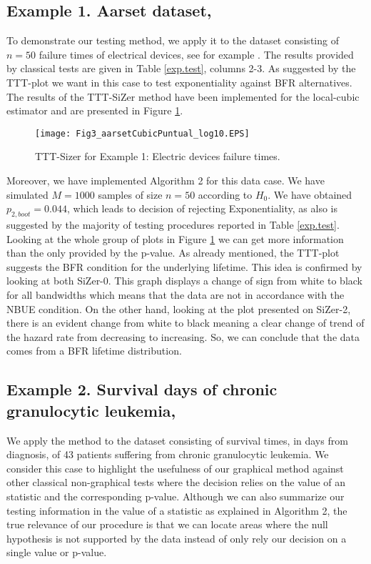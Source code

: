 \documentclass[preprint,12pt]{elsarticle}
\begin{document}
\subsection*{Example 1. Aarset dataset, \cite{A1987}}
To demonstrate our testing method, we apply it to the dataset consisting of $n=50$ failure times of electrical devices, see for example \cite{A1987}. The results provided by classical tests are given in Table \ref{exp.test}, columns 2-3.
As suggested by the TTT-plot we want in this case to test exponentiality against BFR alternatives. The results of the TTT-SiZer method have been implemented for the local-cubic estimator and are presented in Figure \ref{Fig:aarset}. 
\begin{figure}[h]
\begin{center}
\texttt{[image: Fig3\_aarsetCubicPuntual\_log10.EPS]}
\caption{TTT-Sizer for Example 1: Electric devices failure times.}\label{Fig:aarset}
\end{center}
\end{figure}

Moreover, we have implemented Algorithm 2 for this data case. We have simulated $M=1000$ samples of size $n=50$ according to $H_0$. We have obtained $p_{2,boot}=0.044$, which leads to decision of rejecting Exponentiality, as also is suggested by the majority of testing procedures reported in Table \ref{exp.test}. Looking at the whole group of plots in Figure \ref{Fig:aarset} we can get more information than the only provided by the p-value. As already mentioned, the TTT-plot suggests the BFR condition for the underlying lifetime. This idea is confirmed by looking at both SiZer-0. This graph displays a change of sign from white to black for all bandwidths which means that the data are not in accordance with the NBUE condition. On the other hand, looking at the plot presented on SiZer-2, there is an evident change from white to black meaning a clear change of trend of the hazard rate from decreasing to increasing. So, we can conclude that the data comes from a BFR lifetime distribution. 

\subsection*{Example 2. Survival days of chronic granulocytic leukemia, \cite{BS69}}
We apply the method to the dataset consisting of survival times, in days from diagnosis, of 43 patients suffering from chronic granulocytic leukemia.%
We consider this case to highlight the usefulness of our graphical method against other classical non-graphical tests where the decision relies on the value of an statistic and the corresponding p-value. 
Although we can also summarize our testing information in the value of a statistic as explained in Algorithm 2, the true relevance of our procedure is that we can locate areas where the null hypothesis is not supported by the data instead of only rely our decision on a single value or p-value. 
\end{document}
